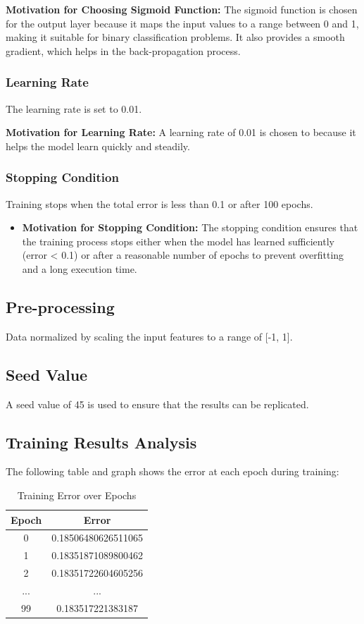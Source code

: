 \documentclass{article}
\begin{document}
\textbf{Motivation for Choosing Sigmoid Function:} The sigmoid function is chosen for the output layer because it maps the input values to a range between 0 and 1, making it suitable for binary classification problems. It also provides a smooth gradient, which helps in the back-propagation process.

\subsubsection{Learning Rate}
The learning rate is set to 0.01.

\textbf{Motivation for Learning Rate:} A learning rate of 0.01 is chosen to because it helps the model learn quickly and steadily. 

\subsubsection{Stopping Condition}
Training stops when the total error is less than 0.1 or after 100 epochs.
\begin{itemize}
\item \textbf{Motivation for Stopping Condition:} The stopping condition ensures that the training process stops either when the model has learned sufficiently (error < 0.1) or after a reasonable number of epochs to prevent overfitting and a long execution time.
\end{itemize}

\subsection{Pre-processing}
Data normalized by scaling the input features to a range of [-1, 1].

\subsection{Seed Value}
A seed value of 45 is used to ensure that the results can be replicated.

\subsection{Training Results Analysis}
The following table and graph shows the error at each epoch during training:

\begin{table}[h!]
\centering
\begin{tabular}{|c|c|}
\hline
Epoch & Error \\
\hline
0 & 0.18506480626511065 \\
1 & 0.18351871089800462 \\
2 & 0.18351722604605256 \\
... & ... \\
99 & 0.183517221383187 \\
\hline
\end{tabular}
\caption{Training Error over Epochs}
\end{table}
\end{document}
